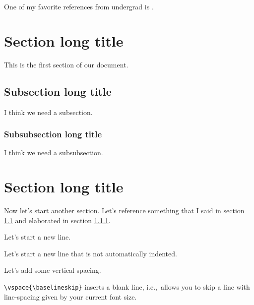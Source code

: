 \documentclass{article}
\begin{document}
\vspace{\baselineskip} %

One of my favorite references from undergrad is \cite{NotSoShortIntro}.

\section[Section short title]{Section long title}

This is the first section of our document.

\subsection[Subsec. short title]{Subsection long title}\label{MySection}

I think we need a subsection.

\subsubsection[Subsubsec. short title]{Subsubsection long title}\label{MySubsubsection}

I think we need a subsubsection.

\section[Section short title]{Section long title}

Now let's start another section. Let's reference something that I said in section \ref{MySection} and elaborated in section \ref{MySubsubsection}.

Let's start a new line. %

\noindent Let's start a new line that is not automatically indented.

Let's add some vertical spacing.

\texttt{\textbackslash vspace\{\textbackslash baselineskip\}} inserts a blank line, i.e.,~allows you to skip a line with line-spacing given by your current font size.

\vspace{\baselineskip} %
\end{document}
